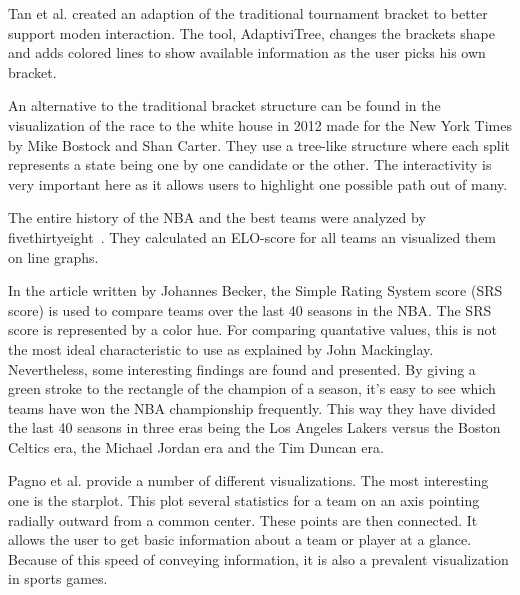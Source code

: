 \documentclass[]{sigchi}
\begin{document}
Tan et al. created an adaption of the traditional tournament bracket to better
support moden interaction\cite{adaptivitree}. The tool, AdaptiviTree, changes
the brackets shape and adds colored lines to show available information as the
user picks his own bracket.

An alternative to the traditional bracket structure can be found in the
visualization of the race to the white house in 2012 made for the New York Times
by Mike Bostock and Shan Carter\cite{whitehousepath}. They use a tree-like
structure where each split represents a state being one by one candidate or the
other. The interactivity is very important here as it allows users to highlight
one possible path out of many.

The entire history of the NBA and the best teams were analyzed by
fivethirtyeight~\cite{fivethirtyeight}. They calculated an ELO-score\cite{elorating} 
for all teams an visualized them on line graphs. 

In the article written by Johannes Becker\cite{nbaempires}, the Simple Rating System 
score (SRS score) is used to compare teams over the last 40 seasons in the NBA. The 
SRS score is represented by a color hue. For comparing quantative values, this is 
not the most ideal characteristic to use as explained by John Mackinglay\cite{automatingdesign}. Nevertheless, some interesting findings are found and presented. By giving a green stroke to the rectangle of the champion of a season, 
it's easy to see which teams have won the NBA championship frequently. This way 
they have divided the last 40 seasons in three eras being the Los Angeles Lakers 
versus the Boston Celtics era, the Michael Jordan era and the Tim Duncan era. 

Pagno et al. provide a number of different visualizations\cite{starplots}. The
most interesting one is the starplot. This plot several statistics for a team on
an axis pointing radially outward from a common center. These points are then
connected. It allows the user to get basic information about a team or player at
a glance. Because of this speed of conveying information, it is also a prevalent
visualization in sports games.



\end{document}
